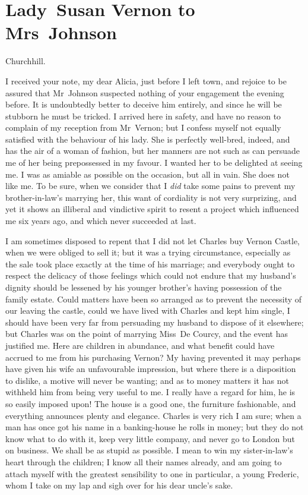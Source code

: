 \chapter{Lady~Susan Vernon to Mrs~Johnson}
  
  \begin{mail}{Churchhill.}{}

I received your note, my dear Alicia, just before I left town, and rejoice to be assured that Mr~Johnson suspected nothing of your engagement the evening before. It is undoubtedly better to deceive him entirely, and since he will be stubborn he must be tricked. I arrived here in safety, and have no reason to complain of my reception from Mr~Vernon; but I confess myself not equally satisfied with the behaviour of his lady. She is perfectly well-bred, indeed, and has the air of a woman of fashion, but her manners are not such as can persuade me of her being prepossessed in my favour. I wanted her to be delighted at seeing me. I was as amiable as possible on the occasion, but all in vain. She does not like me. To be sure, when we consider that I \textit{did} take some pains to prevent my brother-in-law's marrying her, this want of cordiality is not very surprizing, and yet it shows an illiberal and vindictive spirit to resent a project which influenced me six years ago, and which never succeeded at last.

I am sometimes disposed to repent that I did not let Charles buy Vernon Castle, when we were obliged to sell it; but it was a trying circumstance, especially as the sale took place exactly at the time of his marriage; and everybody ought to respect the delicacy of those feelings which could not endure that my husband's dignity should be lessened by his younger brother's having possession of the family estate. Could matters have been so arranged as to prevent the necessity of our leaving the castle, could we have lived with Charles and kept him single, I should have been very far from persuading my husband to dispose of it elsewhere; but Charles was on the point of marrying Miss~De Courcy, and the event has justified me. Here are children in abundance, and what benefit could have accrued to me from his purchasing Vernon? My having prevented it may perhaps have given his wife an unfavourable impression, but where there is a disposition to dislike, a motive will never be wanting; and as to money matters it has not withheld him from being very useful to me. I really have a regard for him, he is so easily imposed upon! The house is a good one, the furniture fashionable, and everything announces plenty and elegance. Charles is very rich I am sure; when a man has once got his name in a banking-house he rolls in money; but they do not know what to do with it, keep very little company, and never go to London but on business. We shall be as stupid as possible. I mean to win my sister-in-law's heart through the children; I know all their names already, and am going to attach myself with the greatest sensibility to one in particular, a young Frederic, whom I take on my lap and sigh over for his dear uncle's sake.


\end{mail}
